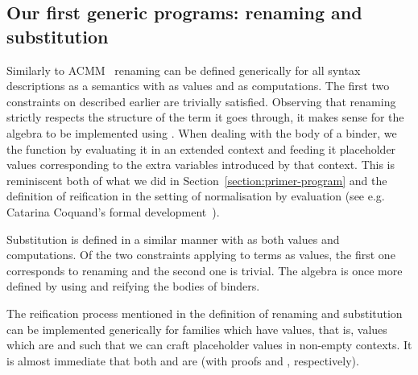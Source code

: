 \subsection{Our first generic programs: renaming and substitution}%
\label{section:renandsub}

Similarly to ACMM~\citeyear{allais2017type} renaming can be defined generically
for all syntax descriptions as a semantics with  as values and  as
computations. The first two constraints on  described earlier are trivially
satisfied. Observing that renaming strictly respects the structure of the term it
goes through, it makes sense for the algebra to be implemented using .
When dealing with the body of a binder, we  the  function by
evaluating it in an extended context and feeding it placeholder values corresponding to
the extra variables introduced by that context. This is reminiscent both of what we
did in Section~\ref{section:primer-program} and the definition of reification in
the setting of normalisation by evaluation
(see e.g. Catarina Coquand's formal development~\citeyear{coquand2002formalised}).

Substitution is defined in a similar manner with  as both
values and computations. Of the two constraints applying to terms as
values, the first one corresponds to renaming and the second
one is trivial. The algebra is once more defined by using 
and reifying the bodies of binders.

\noindent
\begin{minipage}{\textwidth}
\begin{minipage}{0.5\textwidth}
\end{minipage}\hfill
\begin{minipage}{0.5\textwidth}
\end{minipage}
\end{minipage}

The reification process mentioned in the definition of renaming and
substitution can be implemented generically for \semrec{} families
which have  values, that is, values which are  and
such that we can craft placeholder values in non-empty contexts. It is
almost immediate that both  and  are  (with
proofs  and ,
respectively).

